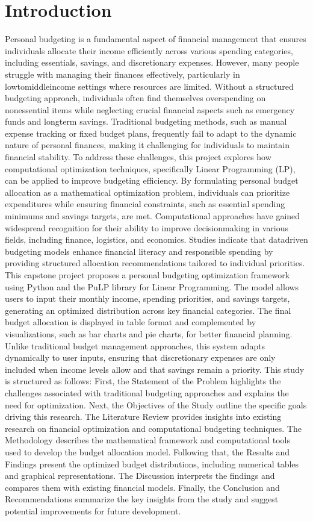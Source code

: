 \documentclass{article}
\begin{document}
\section{Introduction}
Personal budgeting is a fundamental aspect of financial management that ensures individuals allocate their income efficiently across various spending categories, including essentials, savings, and discretionary expenses. However, many people struggle with managing their finances effectively, particularly in lowtomiddleincome settings where resources are limited. Without a structured budgeting approach, individuals often find themselves overspending on nonessential items while neglecting crucial financial aspects such as emergency funds and longterm savings. Traditional budgeting methods, such as manual expense tracking or fixed budget plans, frequently fail to adapt to the dynamic nature of personal finances, making it challenging for individuals to maintain financial stability.
To address these challenges, this project explores how computational optimization techniques, specifically Linear Programming (LP), can be applied to improve budgeting efficiency. By formulating personal budget allocation as a mathematical optimization problem, individuals can prioritize expenditures while ensuring financial constraints, such as essential spending minimums and savings targets, are met. Computational approaches have gained widespread recognition for their ability to improve decisionmaking in various fields, including finance, logistics, and economics. Studies indicate that datadriven budgeting models enhance financial literacy and responsible spending by providing structured allocation recommendations tailored to individual priorities.
This capstone project proposes a personal budgeting optimization framework using Python and the PuLP library for Linear Programming. The model allows users to input their monthly income, spending priorities, and savings targets, generating an optimized distribution across key financial categories. The final budget allocation is displayed in table format and complemented by visualizations, such as bar charts and pie charts, for better financial planning. Unlike traditional budget management approaches, this system adapts dynamically to user inputs, ensuring that discretionary expenses are only included when income levels allow and that savings remain a priority.
This study is structured as follows: First, the Statement of the Problem highlights the challenges associated with traditional budgeting approaches and explains the need for optimization. Next, the Objectives of the Study outline the specific goals driving this research. The Literature Review provides insights into existing research on financial optimization and computational budgeting techniques. The Methodology describes the mathematical framework and computational tools used to develop the budget allocation model. Following that, the Results and Findings present the optimized budget distributions, including numerical tables and graphical representations. The Discussion interprets the findings and compares them with existing financial models. Finally, the Conclusion and Recommendations summarize the key insights from the study and suggest potential improvements for future development.
\end{document}
